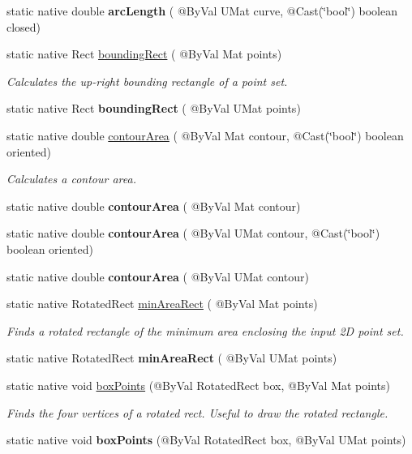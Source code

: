 \begin{DoxyCompactItemize}
static native double {\bfseries arc\+Length} ( @By\+Val U\+Mat curve, @Cast(\char`\"{}bool\char`\"{}) boolean closed)
\item 
static native Rect \hyperlink{group__imgproc__shape_ga8e749f0c2a90af2956b90b60689d6602}{bounding\+Rect} ( @By\+Val Mat points)
\begin{DoxyCompactList}\small\item\em Calculates the up-\/right bounding rectangle of a point set. \end{DoxyCompactList}\item 
static native Rect {\bfseries bounding\+Rect} ( @By\+Val U\+Mat points)
\item 
static native double \hyperlink{group__imgproc__shape_ga5de110872b0023d4176fcc7c3f2c6115}{contour\+Area} ( @By\+Val Mat contour, @Cast(\char`\"{}bool\char`\"{}) boolean oriented)
\begin{DoxyCompactList}\small\item\em Calculates a contour area. \end{DoxyCompactList}\item 
static native double {\bfseries contour\+Area} ( @By\+Val Mat contour)
\item 
static native double {\bfseries contour\+Area} ( @By\+Val U\+Mat contour, @Cast(\char`\"{}bool\char`\"{}) boolean oriented)
\item 
static native double {\bfseries contour\+Area} ( @By\+Val U\+Mat contour)
\item 
static native Rotated\+Rect \hyperlink{group__imgproc__shape_gae621046d95a8ba9f1e1ce112ab8de61a}{min\+Area\+Rect} ( @By\+Val Mat points)
\begin{DoxyCompactList}\small\item\em Finds a rotated rectangle of the minimum area enclosing the input 2D point set. \end{DoxyCompactList}\item 
static native Rotated\+Rect {\bfseries min\+Area\+Rect} ( @By\+Val U\+Mat points)
\item 
static native void \hyperlink{group__imgproc__shape_ga02ee8d410547c387ed348bbb9c2fc213}{box\+Points} (@By\+Val Rotated\+Rect box, @By\+Val Mat points)
\begin{DoxyCompactList}\small\item\em Finds the four vertices of a rotated rect. Useful to draw the rotated rectangle. \end{DoxyCompactList}\item 
static native void {\bfseries box\+Points} (@By\+Val Rotated\+Rect box, @By\+Val U\+Mat points)

\end{DoxyCompactItemize}
